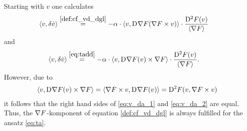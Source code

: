 Starting with $ v $ one calculates
\begin{align}
    \langle  v ,  \delta \dot{ v }  \rangle  &\overset{\eqref{def:cf_vd_dgl}}{=}
    -\alpha \cdot \langle  v ,  \mathrm{D}^{  }\nabla F( \nabla F \times v )  \rangle  \cdot
    \frac{ \mathrm{D}^{ 2 }F( v ) }{ \langle  \nabla F  \rangle }
    \label{eq:v_da_1}
\end{align}
and
\begin{align}
    \langle  v ,  \delta \dot{ v }  \rangle  &\overset{\eqref{eq:tadd}}{=}
    -\alpha \cdot \langle  v ,  \mathrm{D}^{  }\nabla F( v ) \times \nabla F  \rangle  \cdot
    \frac{ \mathrm{D}^{ 2 }F( v ) }{ \langle  \nabla F   \rangle } .
    \label{eq:v_da_2}
\end{align}
However, due to
\begin{align}
    \langle  v ,  \mathrm{D}^{  }\nabla F( v ) \times \nabla F  \rangle  =
    \langle  \nabla F \times v ,  \mathrm{D}^{  }\nabla F( v )  \rangle  =
    \mathrm{D}^{ 2 }F( v, \nabla F \times v )
\end{align}
it follows that the right hand sides
of \eqref{eq:v_da_1} and \eqref{eq:v_da_2} are equal.
Thus, the $ \nabla F $-komponent of equation \eqref{def:cf_vd_dgl}
is always fulfilled for the ansatz \eqref{eq:ta}.


